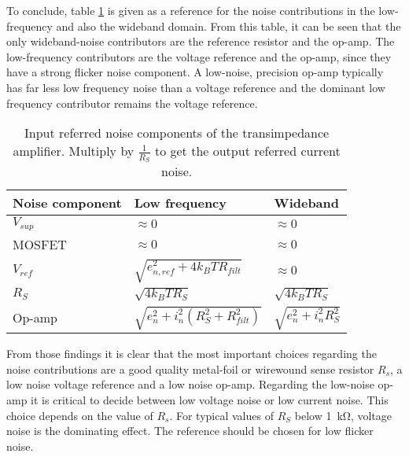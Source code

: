 To conclude, table \ref{tab:current_source_noise_contributers} is given as a reference for the noise contributions in the low-frequency and also the wideband domain. From this table, it can be seen that the only wideband-noise contributors are the reference resistor and the op-amp. The low-frequency contributors are the voltage reference and the op-amp, since they have a strong flicker noise component. A low-noise, precision op-amp typically has far less low frequency noise than a voltage reference and the dominant low frequency contributor remains the voltage reference.
\begin{table}[ht]
    \centering
    \begin{tabular}{lll}
        \toprule
        Noise component& Low frequency& Wideband \\
        \midrule
        $V_{sup}$ & $\approx 0$ & $\approx 0$\\
        MOSFET & $\approx 0$ & $\approx 0$\\
        $V_{ref}$ & $\sqrt{e_{n,ref}^2 + 4 k_B T R_{filt}} $ & $\approx 0$\\
        $R_S$ & $\sqrt{4 k_B T R_S}$ & $\sqrt{4 k_B T R_S}$\\
        Op-amp & $\sqrt{e_n^2 + i_n^2 (R_S^2 + R_{filt}^2)}$ & $\sqrt{e_n^2 + i_n^2 R_S^2}$\\
        \bottomrule
    \end{tabular}
    \caption{Input referred noise components of the transimpedance amplifier. Multiply by $\frac{1}{R_S}$ to get the output referred current noise.}
    \label{tab:current_source_noise_contributers}
\end{table}

From those findings it is clear that the most important choices regarding the noise contributions are a good quality metal-foil or wirewound sense resistor $R_s$, a low noise voltage reference and a low noise op-amp. Regarding the low-noise op-amp it is critical to decide between low voltage noise or low current noise. This choice depends on the value of $R_s$. For typical values of $R_S$ below \qty{1}{\kilo\ohm}, voltage noise is the dominating effect. The reference should be chosen for low flicker noise.

